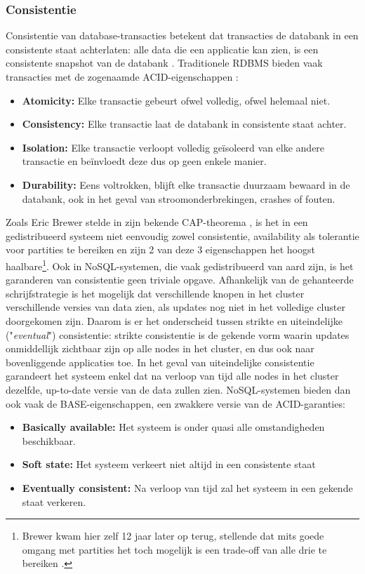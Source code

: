 \subsubsection{Consistentie}

Consistentie van database-transacties betekent dat transacties de databank in een consistente staat achterlaten: alle data die een applicatie kan zien, is een consistente snapshot van de databank \cite{ports2010transactional}. Traditionele RDBMS bieden vaak transacties met de zogenaamde ACID-eigenschappen \cite{haerder1983principles}:
\begin{itemize}
\item \textbf{Atomicity:} Elke transactie gebeurt ofwel volledig, ofwel helemaal niet.
\item \textbf{Consistency:} Elke transactie laat de databank in consistente staat achter.
\item \textbf{Isolation:} Elke transactie verloopt volledig ge\"isoleerd van elke andere transactie en be\"invloedt deze dus op geen enkele manier.
\item \textbf{Durability:} Eens voltrokken, blijft elke transactie duurzaam bewaard in de databank, ook in het geval van stroomonderbrekingen, crashes of fouten.
\end{itemize}

Zoals Eric Brewer stelde in zijn bekende CAP-theorema \cite{brewer2000towards}, is het in een gedistribueerd systeem niet eenvoudig zowel consistentie, availability als tolerantie voor partities te bereiken en zijn 2 van deze 3 eigenschappen het hoogst haalbare\footnote{Brewer kwam hier zelf 12 jaar later op terug, stellende dat mits goede omgang met partities het toch mogelijk is een trade-off van alle drie te bereiken \cite{brewer2012cap}.}.
Ook in NoSQL-systemen, die vaak gedistribueerd van aard zijn, is het garanderen van consistentie geen triviale opgave. Afhankelijk van de gehanteerde schrijfstrategie is het mogelijk dat verschillende knopen in het cluster verschillende versies van data zien, als updates nog niet in het volledige cluster doorgekomen zijn. Daarom is er het onderscheid tussen strikte en uiteindelijke ("\textit{eventual}") consistentie: strikte consistentie is de gekende vorm waarin updates onmiddellijk zichtbaar zijn op alle nodes in het cluster, en dus ook naar bovenliggende applicaties toe. In het geval van uiteindelijke consistentie garandeert het systeem enkel dat na verloop van tijd alle nodes in het cluster dezelfde, up-to-date versie van de data zullen zien. NoSQL-systemen bieden dan ook vaak de BASE-eigenschappen, een zwakkere versie van de ACID-garanties:
\begin{itemize}
\item \textbf{Basically available:} Het systeem is onder quasi alle omstandigheden beschikbaar.
\item \textbf{Soft state:} Het systeem verkeert niet altijd in een consistente staat
\item \textbf{Eventually consistent:} Na verloop van tijd zal het systeem in een gekende staat verkeren.
\end{itemize}

